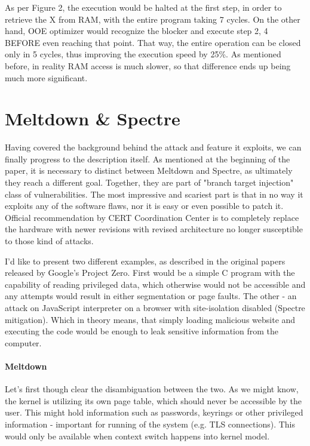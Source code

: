 \documentclass{article}
\begin{document}
As per Figure 2, the execution would be halted at the first step, in order to retrieve the X from RAM, with the entire program taking 7 cycles. On the other hand, OOE optimizer would recognize the blocker and execute step 2, 4 BEFORE even reaching that point. That way, the entire operation can be closed only in 5 cycles, thus improving the execution speed by 25\%. As mentioned before, in reality RAM access is much slower, so that difference ends up being much more significant.

\section{Meltdown \& Spectre}
 
Having covered the background behind the attack and feature it exploits, we can finally progress to the description itself. As mentioned at the beginning of the paper, it is necessary to distinct between Meltdown and Spectre, as ultimately they reach a different goal. Together, they are part of "branch target injection" class of vulnerabilities. The most impressive and scariest part is that in no way it exploits any of the software flaws, nor it is easy or even possible to patch it. Official recommendation by CERT Coordination Center \cite{Replacement} is to completely replace the hardware with newer revisions with revised architecture no longer susceptible to those kind of attacks.

I'd like to present two different examples, as described in the original papers \cite{kocher2018spectre}\cite{lipp2018meltdown} released by Google's Project Zero. First would be a simple C program with the capability of reading privileged data, which otherwise would not be accessible and any attempts would result in either segmentation or page faults.
The other - an attack on JavaScript interpreter on a browser with site-isolation disabled (Spectre mitigation). Which in theory means, that simply loading malicious website and executing the code would be enough to leak sensitive information from the computer. 


\paragraph{Meltdown}
Let's first though clear the disambiguation between the two. As we might know, the kernel is utilizing its own page table, which should never be accessible by the user. This might hold information such as passwords, keyrings or other privileged information - important for running of the system (e.g. TLS connections). This would only be available when context switch happens into kernel model.
\end{document}
